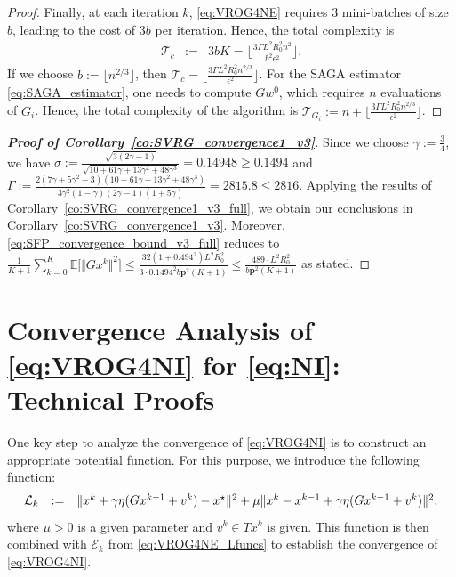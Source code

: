 \documentclass{article}
\newcommand{\norms}[1]{\Vert#1\Vert}
\newcommand{\Expk}[1]{\mathbb{E}\big[#1\big]}
\newcommand{\Lc}{\mathcal{L}}
\newcommand{\Tc}{\mathcal{T}}
\newcommand{\Ec}{\mathcal{E}}
\newcommand{\mbf}[1]{\mathbf{#1}}
\newcommand{\beforesec}{\vspace{-1.5ex}}
\newcommand{\aftersec}{\vspace{-1.25ex}}
\theoremstyle{plain}
\theoremstyle{definition}
\theoremstyle{remark}
\begin{document}
\begin{proof}
Finally, at each iteration $k$, \eqref{eq:VROG4NE} requires $3$ mini-batches of size $b$, leading to the cost of $3b$ per iteration.
Hence, the total complexity is 
\begin{equation*}
\begin{array}{lcl}
\Tc_{c} & := &  3bK = \big\lfloor \frac{ 3\Gamma L^2 R_0^2 n^2 }{ b^2 \epsilon^2} \big\rfloor.
\end{array}
\end{equation*}
If we choose $b := \lfloor n^{2/3} \rfloor$, then $\Tc_{c} = \big\lfloor \frac{3\Gamma  L^2R_0^2 n^{2/3} }{\epsilon^2} \big\rfloor$.
For the SAGA estimator \eqref{eq:SAGA_estimator}, one needs to compute $Gw^0$, which requires $n$ evaluations of $G_i$.
Hence, the total complexity of the algorithm is $\Tc_{G_i} := n + \big\lfloor\frac{3\Gamma L^2R_0^2  n^{2/3}  }{\epsilon^2} \big\rfloor$.
\end{proof}

\begin{proof}[\textbf{Proof of Corollary~\ref{co:SVRG_convergence1_v3}}]
Since we choose $\gamma := \frac{3}{4}$, we have $\sigma := \frac{\sqrt{3(2\gamma-1)}}{\sqrt{10 + 61\gamma + 13\gamma^2 + 48\gamma^3}} = 0.14948 \geq 0.1494$ and $\Gamma := \frac{2(7\gamma + 5\gamma^2-3)(10 + 61\gamma + 13\gamma^2 + 48\gamma^3)}{3\gamma^2(1-\gamma)(2\gamma-1)(1+5\gamma)} = 2815.8 \leq 2816$.
Applying the results of Corollary~\ref{co:SVRG_convergence1_v3_full}, we obtain our conclusions in Corollary~\ref{co:SVRG_convergence1_v3}.
Moreover, \eqref{eq:SFP_convergence_bound_v3_full} reduces to $\frac{1}{K+1}\sum_{k=0}^{K} \Expk{ \norms{Gx^k}^2 }   \leq     \frac{32(1 + 0.494^2) L^2 R_0^2 }{3\cdot 0.1494^2 b\mbf{p}^2 (K + 1)} \leq \frac{489 \cdot L^2R_0^2}{b\mbf{p}^2(K+1)}$ as stated.
\end{proof}

\beforesec
\section{Convergence Analysis of \ref{eq:VROG4NI} for \eqref{eq:NI}: Technical Proofs}\label{apdx:sec:VROG4NI}
\aftersec
One key step to analyze the convergence of \eqref{eq:VROG4NI} is to construct an appropriate potential function.
For this purpose, we introduce the following function:
\vspace{-0.5ex}
\begin{equation}\label{eq:VROG4NI_Lfuncs}
\begin{array}{lcl}
\Lc_k & := &  \norms{x^k + \gamma\eta (Gx^{k-1} + v^{k}) - x^{\star}}^2 + \mu \norms{x^k - x^{k-1} + \gamma\eta(Gx^{k-1} + v^k) }^2,
\end{array}
\vspace{-0.25ex}
\end{equation}
where $\mu > 0$ is a given parameter  and $v^k \in Tx^k$ is given.
This function is then combined with $\Ec_k$ from \eqref{eq:VROG4NE_Lfuncs} to establish the convergence of \eqref{eq:VROG4NI}.
\end{document}
